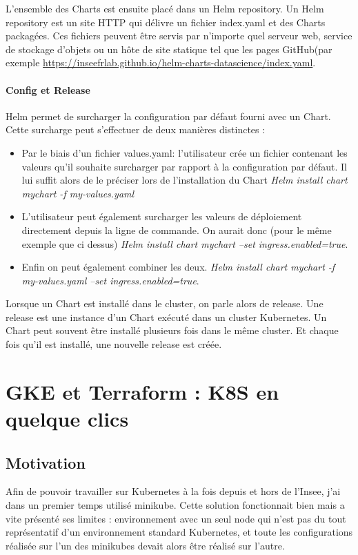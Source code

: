\documentclass[11pt,fleqn]{book} %
\begin{document}
L'ensemble des Charts est ensuite placé dans un Helm repository. Un Helm repository est un site HTTP qui délivre un fichier index.yaml et des Charts packagées. Ces fichiers peuvent être servis par n'importe quel serveur web, service de stockage d'objets ou un hôte de site statique tel que les pages GitHub(par exemple \url{https://inseefrlab.github.io/helm-charts-datascience/index.yaml}.

\subsubsection{Config et Release}
Helm permet de surcharger la configuration par défaut fourni avec un Chart. Cette surcharge peut s'effectuer de deux manières distinctes :
\begin{itemize}
    \item Par le biais d'un fichier values.yaml: l'utilisateur crée un fichier contenant les valeurs qu'il souhaite surcharger par rapport à la configuration par défaut.
    Il lui suffit alors de le préciser lors de l'installation du Chart \textit{Helm install chart mychart -f my-values.yaml}
    \item L'utilisateur peut également surcharger les valeurs de déploiement directement depuis la ligne de commande. On aurait donc (pour le même exemple que ci dessus) \textit{Helm install chart mychart --set ingress.enabled=true}.
    \item Enfin on peut également combiner les deux. \textit{Helm install chart mychart -f my-values.yaml --set ingress.enabled=true}.
\end{itemize}

Lorsque un Chart est installé dans le cluster, on parle alors de release. Une release est une instance d'un Chart exécuté dans un cluster Kubernetes. Un Chart peut souvent être installé plusieurs fois dans le même cluster. Et chaque fois qu'il est installé, une nouvelle release est créée.


\chapter{GKE et Terraform : K8S en quelque clics}
\label{Terraform}
\vspace{-2cm}
\section*{Motivation}
Afin de pouvoir travailler sur Kubernetes à la fois depuis et hors de l'Insee, j'ai dans un premier temps utilisé minikube. Cette solution fonctionnait bien mais a vite présenté ses limites : environnement avec un seul node qui n'est pas du tout représentatif d'un environnement standard Kubernetes, et toute les configurations réalisée sur l'un des minikubes devait alors être réalisé sur l'autre.\newline
\end{document}
